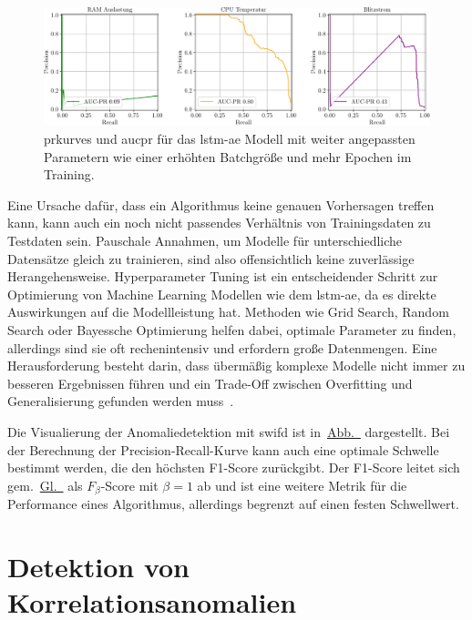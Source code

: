 \begin{figure}[b!]
    \centering
        \includegraphics[width=1\linewidth]{ch5_anomalieerkennung/abbildungen/LSTMAE_PR_AUC_PR_2.pdf}
    \caption{\centering \acp*{prkurve} und \acs*{aucpr} für das \acs*{lstm-ae} Modell mit weiter angepassten Parametern wie einer erhöhten Batchgröße und mehr Epochen
    im Training.}
    \label{fig:LSTMAE_AUC_PR_2}
\end{figure}

Eine Ursache dafür, dass ein Algorithmus keine genauen Vorhersagen treffen kann, kann auch ein noch nicht passendes Verhältnis von Trainingsdaten zu
Testdaten sein. Pauschale Annahmen, um Modelle für unterschiedliche Datensätze gleich zu trainieren, sind also offensichtlich keine zuverlässige
Herangehensweise. Hyperparameter Tuning ist ein entscheidender Schritt zur Optimierung von Machine Learning Modellen wie dem \ac{lstm-ae}, da es direkte
Auswirkungen auf die Modellleistung hat. Methoden wie Grid Search, Random Search oder Bayessche Optimierung helfen dabei, optimale Parameter zu finden,
allerdings sind sie oft rechenintensiv und erfordern große Datenmengen. Eine Herausforderung besteht darin, dass übermäßig komplexe Modelle nicht immer
zu besseren Ergebnissen führen und ein Trade-Off zwischen Overfitting und Generalisierung gefunden werden muss~\cite{Iravani2022}.

Die Visualierung der Anomaliedetektion mit \ac{swifd} ist in~\hyperref[fig:SWIFD_visualisierung]{Abb.~} dargestellt. Bei
der Berechnung der Precision-Recall-Kurve kann auch eine optimale Schwelle bestimmt werden, die den höchsten F1-Score zurückgibt. Der F1-Score
leitet sich gem.~\hyperref[eq:fbeta]{Gl.~} als $F_\beta$-Score mit $\beta=1$ ab und ist eine weitere Metrik für die Performance eines Algorithmus,
allerdings begrenzt auf einen festen Schwellwert.
\newpage

\section{Detektion von Korrelationsanomalien}

